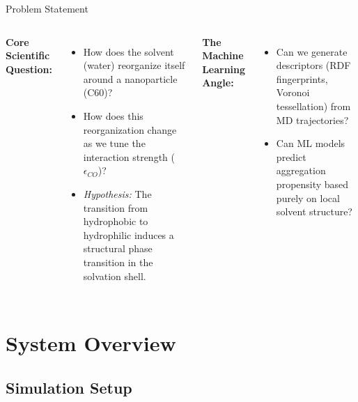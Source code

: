 \documentclass[aspectratio=169, 10pt]{beamer}
\begin{document}
\begin{frame}{Problem Statement}
    \begin{columns}
        \textbf{Core Scientific Question:}
        \begin{itemize}
            \item How does the solvent (water) reorganize itself around a nanoparticle (C60)?
            \item How does this reorganization change as we tune the interaction strength ($\epsilon_{CO}$)?
            \item \textit{Hypothesis:} The transition from hydrophobic to hydrophilic induces a structural phase transition in the solvation shell.
        \end{itemize}
        
        \vspace{0.5cm}
        \textbf{The Machine Learning Angle:}
        \begin{itemize}
            \item Can we generate descriptors (RDF fingerprints, Voronoi tessellation) from MD trajectories?
            \item Can ML models predict aggregation propensity based purely on local solvent structure?
        \end{itemize}

        \centering
    \end{columns}
\end{frame}

\section{System Overview}
\subsection{Simulation Setup}
\end{document}
